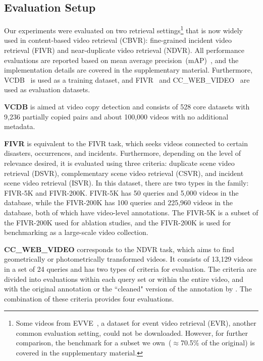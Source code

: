 \documentclass[10pt,twocolumn,letterpaper]{article}
\begin{document}
    \subsection{Evaluation Setup}
    
        Our experiments were evaluated on two retrieval settings\footnote{Some videos from EVVE~\cite{revaud2013event}, a dataset for event video retrieval (EVR), another common evaluation setting, could not be downloaded. However, for further comparison, the benchmark for a subset we own~($\approx$70.5\% of the original) is covered in the supplementary material.} that is now widely used in content-based video retrieval (CBVR): fine-grained incident video retrieval (FIVR) and near-duplicate video retrieval (NDVR). All performance evaluations are reported based on mean average precision~(mAP)~\cite{zhu2004recall}, and the implementation details are covered in the supplementary material. Furthermore, VCDB~\cite{jiang2014vcdb} is used as a training dataset, and FIVR~\cite{kordopatis2019fivr} and CC\_WEB\_VIDEO~\cite{wu2009real} are used as evaluation datasets.
        
        \textbf{VCDB} is aimed at video copy detection and consists of 528 core datasets with 9,236 partially copied pairs and about 100,000 videos with no additional metadata. 

        \textbf{FIVR} is equivalent to the FIVR task, which seeks videos connected to certain disasters, occurrences, and incidents. Furthermore, depending on the level of relevance desired, it is evaluated using three criteria: duplicate scene video retrieval (DSVR), complementary scene video retrieval (CSVR), and incident scene video retrieval (ISVR). In this dataset, there are two types in the family: FIVR-5K and FIVR-200K. FIVR-5K has 50 queries and 5,000 videos in the database, while the FIVR-200K has 100 queries and 225,960 videos in the database, both of which have video-level annotations. The FIVR-5K is a subset of the FIVR-200K used for ablation studies, and the FIVR-200K is used for benchmarking as a large-scale video collection.
        
        \textbf{CC\_WEB\_VIDEO} corresponds to the NDVR task, which aims to find geometrically or photometrically transformed videos. It consists of 13,129 videos in a set of 24 queries and has two types of criteria for evaluation. The criteria are divided into evaluations within each query set or within the entire video, and with the original annotation or the ``cleaned" version of the annotation by \cite{kordopatis2019visil}. The combination of these criteria provides four evaluations.
    
\end{document}
